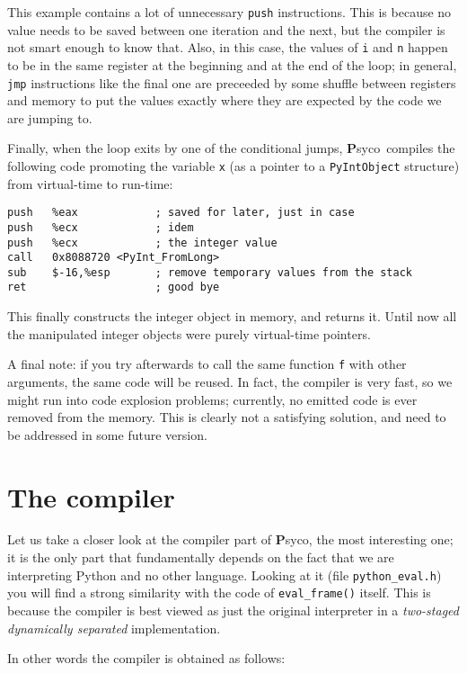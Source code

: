 \documentclass{article}
\def\Psyco{{\bf P}syco}
\def\code#1{\texttt{#1}}
\begin{document}
This example contains a lot of unnecessary \code{push} instructions. This is because no value needs to be saved between one iteration and the next, but the compiler is not smart enough to know that. Also, in this case, the values of \code{i} and \code{n} happen to be in the same register at the beginning and at the end of the loop; in general, \code{jmp} instructions like the final one are preceeded by some shuffle between registers and memory to put the values exactly where they are expected by the code we are jumping to.

Finally, when the loop exits by one of the conditional jumps, \Psyco\ compiles the following code promoting the variable \code{x} (as a pointer to a \code{PyIntObject} structure) from virtual-time to run-time:

\begin{verbatim}
push   %eax            ; saved for later, just in case
push   %ecx            ; idem
push   %ecx            ; the integer value
call   0x8088720 <PyInt_FromLong>
sub    $-16,%esp       ; remove temporary values from the stack
ret                    ; good bye
\end{verbatim}

This finally constructs the integer object in memory, and returns it. Until now all the manipulated integer objects were purely virtual-time pointers.

A final note: if you try afterwards to call the same function \code{f} with other arguments, the same code will be reused. In fact, the compiler is very fast, so we might run into code explosion problems; currently, no emitted code is ever removed from the memory. This is clearly not a satisfying solution, and need to be addressed in some future version.



\section{The compiler}


Let us take a closer look at the compiler part of \Psyco, the most interesting one; it is the only part that fundamentally depends on the fact that we are interpreting Python and no other language. Looking at it (file \code{python\_eval.h}) you will find a strong similarity with the code of \code{eval\_frame()} itself. This is because the compiler is best viewed as just the original interpreter in a \emph{two-staged dynamically separated} implementation.

In other words the compiler is obtained as follows:
\end{document}
